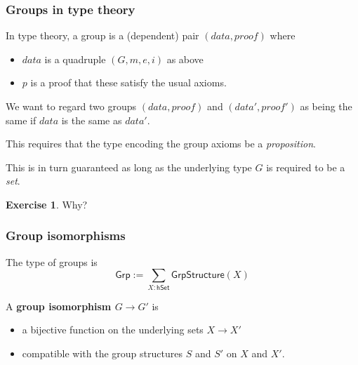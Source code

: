 \documentclass{beamer}
\newcommand{\fat}[1]{\textbf{#1}}
\newcommand{\constfont}[1]{\ensuremath{\mathsf{#1}}}
\newcommand{\Grp}{\constfont{Grp}}
\newcommand{\GrpStructure}{\constfont{GrpStructure}}
\newcommand{\hSet}{\constfont{hSet}}
\theoremstyle{definition}
\newtheorem{exercise}{Exercise}
\begin{document}
\begin{frame}
 \frametitle{Groups in type theory}

    In type theory, a group is a (dependent) pair $(data, proof)$ where
      \begin{itemize}
       \item $data$ is a quadruple $(G,m,e,i)$ as above
       \item $p$ is a proof that these satisfy the usual axioms.
      \end{itemize}

      \pause
      We want to regard two groups $(data, proof)$ and $(data', proof')$ as being the same if $data$ is the same as $data'$.

      \pause
      This requires that the type encoding the group axioms be a \emph{proposition}.

      \pause
      This is in turn guaranteed as long as the underlying type $G$ is required to be a \emph{set}.

      \begin{exercise}
        Why?
      \end{exercise}
\end{frame}

\begin{frame}
  \frametitle{Group isomorphisms}

  The type of groups is
  \[ \Grp := \sum_{X : \hSet}\GrpStructure(X) \]

  \begin{block}{A \fat{group isomorphism $G \to G'$} is }
    \begin{itemize}
    \item a bijective function on the underlying sets $X \to X'$
    \item compatible with the group structures $S$ and $S'$ on $X$ and $X'$.
    \end{itemize}
  \end{block}

\end{frame}
\end{document}
